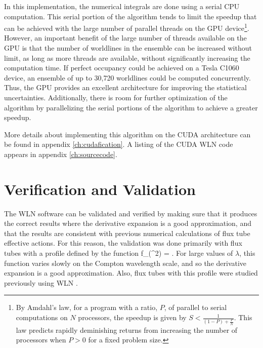 In this implementation, the numerical integrals are done using a serial CPU
computation. 
This serial portion of the algorithm tends to limit the speedup that can be achieved with 
the large number of parallel threads on the \ac{GPU} device\footnote{By Amdahl's law, 
for a program with a ratio, $P$, of parallel to serial computations on $N$ processors, 
the speedup is given by $S < \frac{1}{(1-P)+\frac{P}{N}}$. This law predicts 
rapidly deminishing returns from increasing the number of processors when $P>0$ 
for a fixed problem size.}. 
However, an important 
benefit of the large number of threads available on the \ac{GPU} is that the 
number of worldlines in the ensemble can be increased without limit, as long 
as more threads are available, without significantly increasing the computation time. 
If perfect occupancy could be achieved on a Tesla C1060 device, an ensemble 
of up to 30,720 worldlines could be computed concurrently.
Thus, the \ac{GPU} provides an excellent architecture for improving the 
statistical uncertainties. Additionally, there is room for further optimization of 
the algorithm by parallelizing the serial portions of the 
algorithm to achieve a greater speedup.

More details about implementing this algorithm on the \ac{CUDA} architecture 
can be found in appendix \ref{ch:cudafication}. A listing of the 
\ac{CUDA} \ac{WLN} code appears in appendix \ref{ch:sourcecode}. 



\section{Verification and Validation}

The \ac{WLN} software can be validated and verified by making sure that it 
produces the correct results where the derivative expansion is a good approximation, 
and that the results are consistent with previous numerical calculations of flux tube 
effective actions. For this reason, the validation was done primarily with flux tubes with 
a profile defined by the function
\be
	f_\lambda(\rho^2) = .
\ee
For large values of $\lambda$, this function varies slowly on the Compton wavelength 
scale, and so the derivative expansion is a good approximation. Also, flux tubes 
with this profile were studied previously using \ac{WLN}
\cite{Moyaerts:2003ts, MoyaertsLaurent:2004}.


